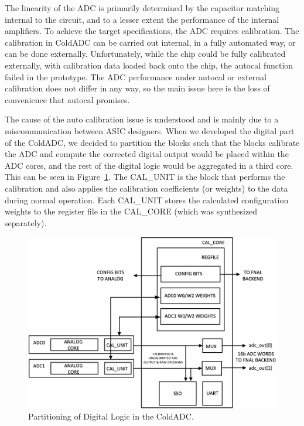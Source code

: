 \label{sec:5.1}


The linearity of the ADC is primarily determined by the capacitor matching internal to the circuit, and to a lesser extent the performance of the internal amplifiers. To achieve the target specifications, the ADC requires calibration. The calibration in ColdADC can be carried out internal, in a fully automated way, or can be done externally. Unfortunately, while the chip could be fully calibrated externally, with calibration data loaded back onto the chip, the autocal function failed in the prototype. The ADC performance under autocal or external calibration does not differ in any way, so the main issue here is the loss of convenience that autocal promises.

The cause of the auto calibration issue is understood and is mainly due to a miscommunication between ASIC designers. When we developed the digital part of the ColdADC, we decided to partition the blocks such that the blocks calibrate the ADC and compute the corrected digital output would be placed within the ADC cores, and the rest of the digital logic would be aggregated in a third core. This can be seen in Figure~\ref{fig:autocalBlock}. The CAL\_UNIT is the block that performs the calibration and also applies the calibration coefficients (or weights) to the data during normal operation. Each CAL\_UNIT stores the calculated configuration weights to the register file in the CAL\_CORE (which was synthesized separately).
\begin{figure}[h]
\centering
\begin{center}
\includegraphics[width=1.0\textwidth]{figures/autocalBlock.png}
\end{center}
\caption{Partitioning of Digital Logic in the ColdADC.}
\label{fig:autocalBlock}
\end{figure}


